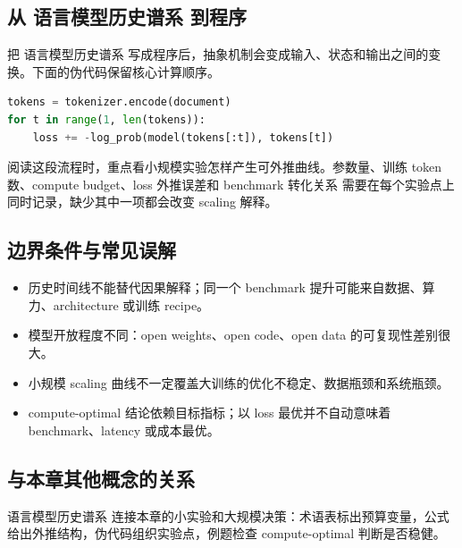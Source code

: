 \documentclass[a4paper]{article}
\begin{document}
\subsection{从 语言模型历史谱系 到程序}
把 语言模型历史谱系 写成程序后，抽象机制会变成输入、状态和输出之间的变换。下面的伪代码保留核心计算顺序。
\begin{lstlisting}[language=Python]
tokens = tokenizer.encode(document)
for t in range(1, len(tokens)):
    loss += -log_prob(model(tokens[:t]), tokens[t])
\end{lstlisting}
阅读这段流程时，重点看小规模实验怎样产生可外推曲线。参数量、训练 token 数、compute budget、loss 外推误差和 benchmark 转化关系 需要在每个实验点上同时记录，缺少其中一项都会改变 scaling 解释。
\subsection{边界条件与常见误解}
\begin{itemize}
\item 历史时间线不能替代因果解释；同一个 benchmark 提升可能来自数据、算力、architecture 或训练 recipe。
\item 模型开放程度不同：open weights、open code、open data 的可复现性差别很大。
\item 小规模 scaling 曲线不一定覆盖大训练的优化不稳定、数据瓶颈和系统瓶颈。
\item compute-optimal 结论依赖目标指标；以 loss 最优并不自动意味着 benchmark、latency 或成本最优。
\end{itemize}
\subsection{与本章其他概念的关系}
语言模型历史谱系 连接本章的小实验和大规模决策：术语表标出预算变量，公式给出外推结构，伪代码组织实验点，例题检查 compute-optimal 判断是否稳健。
\end{document}
